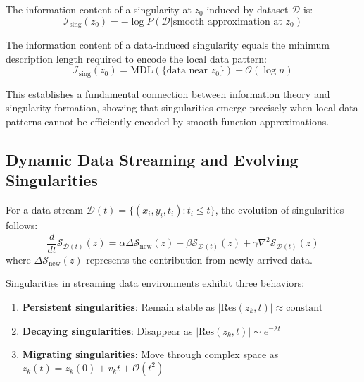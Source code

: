 \begin{definition}
\begin{enumerate}
\begin{definition}
The information content of a singularity at $z_0$ induced by dataset $\mathcal{D}$ is:
\begin{equation}
\mathcal{I}_{\text{sing}}(z_0) = -\log P(\mathcal{D} | \text{smooth approximation at } z_0)
\end{equation}
\end{definition}

\begin{theorem}
The information content of a data-induced singularity equals the minimum description length required to encode the local data pattern:
\begin{equation}
\mathcal{I}_{\text{sing}}(z_0) = \text{MDL}(\{\text{data near } z_0\}) + \mathcal{O}(\log n)
\end{equation}
\end{theorem}

This establishes a fundamental connection between information theory and singularity formation, showing that singularities emerge precisely when local data patterns cannot be efficiently encoded by smooth function approximations.

\subsection{Dynamic Data Streaming and Evolving Singularities}

\begin{definition}
For a data stream $\mathcal{D}(t) = \{(x_i, y_i, t_i) : t_i \leq t\}$, the evolution of singularities follows:
\begin{equation}
\frac{d}{dt} \mathcal{S}_{\mathcal{D}(t)}(z) = \alpha \Delta \mathcal{S}_{\text{new}}(z) + \beta \mathcal{S}_{\mathcal{D}(t)}(z) + \gamma \nabla^2 \mathcal{S}_{\mathcal{D}(t)}(z)
\end{equation}
where $\Delta \mathcal{S}_{\text{new}}(z)$ represents the contribution from newly arrived data.
\end{definition}

\begin{theorem}
Singularities in streaming data environments exhibit three behaviors:
\begin{enumerate}
\item \textbf{Persistent singularities}: Remain stable as $|\text{Res}(z_k, t)| \approx \text{constant}$
\item \textbf{Decaying singularities}: Disappear as $|\text{Res}(z_k, t)| \sim e^{-\lambda t}$
\item \textbf{Migrating singularities}: Move through complex space as $z_k(t) = z_k(0) + v_k t + \mathcal{O}(t^2)$
\end{enumerate}
\end{theorem}


\end{enumerate}
\end{definition}
